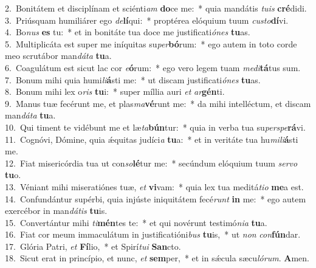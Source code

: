 {2.~}Bonitátem et disciplínam et sciénti\textit{am} \textbf{do}ce me:~* quia mandátis \textit{tu}\textit{is} \textbf{cré}didi.\\
{3.~}Priúsquam humiliárer ego \textit{de}\textbf{lí}qui:~* proptérea elóquium tuum \textit{cu}\textit{sto}\textbf{dí}vi.\\
{4.~}Bo\textit{nus} \textbf{es} tu:~* et in bonitáte tua doce me justificati\textit{ó}\textit{nes} \textbf{tu}as.\\
{5.~}Multiplicáta est super me iníquitas su\textit{per}\textbf{bó}rum:~* ego autem in toto corde meo scrutábor man\textit{dá}\textit{ta} \textbf{tu}a.\\
{6.~}Coagulátum est sicut lac cor \textit{e}\textbf{ó}rum:~* ego vero legem tuam \textit{me}\textit{di}\textbf{tá}tus sum.\\
{7.~}Bonum mihi quia humi\textit{li}\textbf{á}sti me:~* ut discam justificati\textit{ó}\textit{nes} \textbf{tu}as.\\
{8.~}Bonum mihi lex o\textit{ris} \textbf{tu}i:~* super míllia auri \textit{et} \textit{ar}\textbf{gén}ti.\\
{9.~}Manus tuæ fecérunt me, et plas\textit{ma}\textbf{vé}runt me:~* da mihi intelléctum, et discam man\textit{dá}\textit{ta} \textbf{tu}a.\\
{10.~}Qui timent te vidébunt me et læ\textit{ta}\textbf{bún}tur:~* quia in verba tua su\textit{per}\textit{spe}\textbf{rá}vi.\\
{11.~}Cognóvi, Dómine, quia ǽquitas judíci\textit{a} \textbf{tu}a:~* et in veritáte tua hu\textit{mi}\textit{li}\textbf{á}sti me.\\
{12.~}Fiat misericórdia tua ut con\textit{so}\textbf{lé}tur me:~* secúndum elóquium tuum \textit{ser}\textit{vo} \textbf{tu}o.\\
{13.~}Véniant mihi miseratiónes tuæ, \textit{et} \textbf{vi}vam:~* quia lex tua meditá\textit{ti}\textit{o} \textbf{me}a est.\\
{14.~}Confundántur supérbi, quia injúste iniquitátem fecé\textit{runt} \textbf{in} me:~* ego autem exercébor in man\textit{dá}\textit{tis} \textbf{tu}is.\\
{15.~}Convertántur mihi \textit{ti}\textbf{mén}tes te:~* et qui novérunt testimó\textit{ni}\textit{a} \textbf{tu}a.\\
{16.~}Fiat cor meum immaculátum in justificatióni\textit{bus} \textbf{tu}is,~* ut \textit{non} \textit{con}\textbf{fún}dar.\\
{17.~}Glória Patri, \textit{et} \textbf{Fí}lio,~* et Spirí\textit{tu}\textit{i} \textbf{San}cto.\\
{18.~}Sicut erat in princípio, et nunc, \textit{et} \textbf{sem}per,~* et in sǽcula sæcu\textit{ló}\textit{rum}. \textbf{A}men.\\
